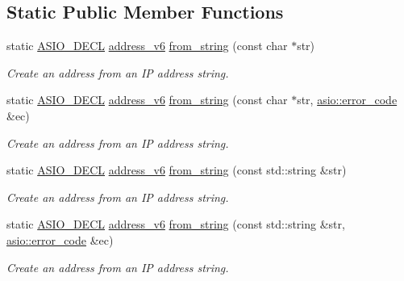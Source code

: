 \subsection*{Static Public Member Functions}
\begin{DoxyCompactItemize}
\item 
static \hyperlink{config_8hpp_ab54d01ea04afeb9a8b39cfac467656b7}{A\+S\+I\+O\+\_\+\+D\+E\+C\+L} \hyperlink{classasio_1_1ip_1_1address__v6}{address\+\_\+v6} \hyperlink{classasio_1_1ip_1_1address__v6_ab6283a74324595420e2da9b960870027}{from\+\_\+string} (const char $\ast$str)
\begin{DoxyCompactList}\small\item\em Create an address from an I\+P address string. \end{DoxyCompactList}\item 
static \hyperlink{config_8hpp_ab54d01ea04afeb9a8b39cfac467656b7}{A\+S\+I\+O\+\_\+\+D\+E\+C\+L} \hyperlink{classasio_1_1ip_1_1address__v6}{address\+\_\+v6} \hyperlink{classasio_1_1ip_1_1address__v6_af796de33a41f8c519389732a4dcda54e}{from\+\_\+string} (const char $\ast$str, \hyperlink{classasio_1_1error__code}{asio\+::error\+\_\+code} \&ec)
\begin{DoxyCompactList}\small\item\em Create an address from an I\+P address string. \end{DoxyCompactList}\item 
static \hyperlink{config_8hpp_ab54d01ea04afeb9a8b39cfac467656b7}{A\+S\+I\+O\+\_\+\+D\+E\+C\+L} \hyperlink{classasio_1_1ip_1_1address__v6}{address\+\_\+v6} \hyperlink{classasio_1_1ip_1_1address__v6_a1e23ceec8a07dd080ee5b57724f9a8c1}{from\+\_\+string} (const std\+::string \&str)
\begin{DoxyCompactList}\small\item\em Create an address from an I\+P address string. \end{DoxyCompactList}\item 
static \hyperlink{config_8hpp_ab54d01ea04afeb9a8b39cfac467656b7}{A\+S\+I\+O\+\_\+\+D\+E\+C\+L} \hyperlink{classasio_1_1ip_1_1address__v6}{address\+\_\+v6} \hyperlink{classasio_1_1ip_1_1address__v6_a47d5801977b3dcb405fef63e2a62873e}{from\+\_\+string} (const std\+::string \&str, \hyperlink{classasio_1_1error__code}{asio\+::error\+\_\+code} \&ec)
\begin{DoxyCompactList}\small\item\em Create an address from an I\+P address string. \end{DoxyCompactList}\item 

\end{DoxyCompactItemize}
